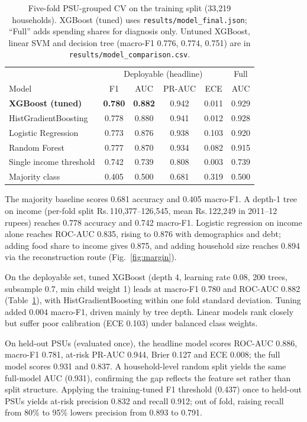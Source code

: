 \documentclass[conference]{IEEEtran}
\newcommand{\rs}{Rs.\,}
\begin{document}
\begin{table}[t]
    \centering
    \caption{Five-fold PSU-grouped CV on the training split (33,219 households). XGBoost (tuned) uses \texttt{results/model\_final.json}; ``Full'' adds spending shares for diagnosis only. Untuned XGBoost, linear SVM and decision tree (macro-F1 0.776, 0.774, 0.751) are in \texttt{results/model\_comparison.csv}.}
    \label{tab:models}
    \footnotesize
    \setlength{\tabcolsep}{3pt}
    \begin{tabular}{l c c c c c}
        \toprule
        & \multicolumn{4}{c}{Deployable (headline)} & Full \\
        Model & F1 & AUC & PR-AUC & ECE & AUC \\
        \midrule
        \textbf{XGBoost (tuned)} & \textbf{0.780} & \textbf{0.882} & 0.942 & 0.011 & 0.929 \\
        HistGradientBoosting & 0.778 & 0.880 & 0.941 & 0.012 & 0.928 \\
        Logistic Regression & 0.773 & 0.876 & 0.938 & 0.103 & 0.920 \\
        Random Forest & 0.777 & 0.870 & 0.934 & 0.082 & 0.915 \\
        \midrule
        Single income threshold & 0.742 & 0.739 & 0.808 & 0.003 & 0.739 \\
        Majority class & 0.405 & 0.500 & 0.681 & 0.319 & 0.500 \\
        \bottomrule
    \end{tabular}
\end{table}

The majority baseline scores 0.681 accuracy and 0.405 macro-F1. A depth-1 tree on income (per-fold split \rs 110,377--126,545, mean \rs 122,249 in 2011--12 rupees) reaches 0.778 accuracy and 0.742 macro-F1. Logistic regression on income alone reaches ROC-AUC 0.835, rising to 0.876 with demographics and debt; adding food share to income gives 0.875, and adding household size reaches 0.894 via the reconstruction route (Fig.~\ref{fig:margin}).

On the deployable set, tuned XGBoost (depth 4, learning rate 0.08, 200 trees, subsample 0.7, min child weight 1) leads at macro-F1 0.780 and ROC-AUC 0.882 (Table~\ref{tab:models}), with HistGradientBoosting within one fold standard deviation. Tuning added 0.004 macro-F1, driven mainly by tree depth. Linear models rank closely but suffer poor calibration (ECE 0.103) under balanced class weights.

On held-out PSUs (evaluated once), the headline model scores ROC-AUC 0.886, macro-F1 0.781, at-risk PR-AUC 0.944, Brier 0.127 and ECE 0.008; the full model scores 0.931 and 0.837. A household-level random split yields the same full-model AUC (0.931), confirming the gap reflects the feature set rather than split structure. Applying the training-tuned F1 threshold (0.437) once to held-out PSUs yields at-risk precision 0.832 and recall 0.912; out of fold, raising recall from 80\% to 95\% lowers precision from 0.893 to 0.791.
\end{document}
